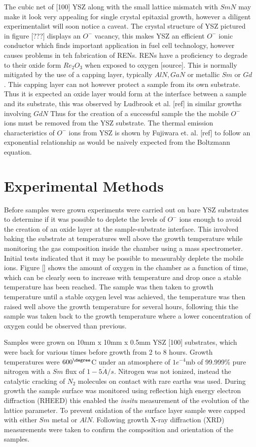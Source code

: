 \documentclass[11pt]{article}
\begin{document}
The cubic net of [100] YSZ along with the small lattice mismatch with $SmN$ may make it look very appealing for single crystal epitaxial growth, however a diligent experimentalist will soon notice a caveat. The crystal structure of YSZ pictured in figure [???] displays an $O^-$ vacancy, this makes YSZ an efficient $O^-$ ionic conductor which finds important application in fuel cell technology, however causes problems in teh fabrication of RENs. RENs have a proficiency to degrade to their oxide form $Re_2O_3$ when exposed to oxygen [source]. This is normally mitigated by the use of a capping layer, typically $AlN, GaN$ or metallic $Sm$ or $Gd$. This capping layer can not however protect a sample from its own substrate. Thus it is expected an oxide layer would form at the interface between a sample and its substrate, this
was observed by Ludbrook et al. [ref] in similar growths involving $GdN$ Thus for the creation of a successful sample the the mobile $O^-$ ions must be removed from the YSZ substrate. The thermal emission characteristics of $O^-$ ions from YSZ is shown by Fujiwara et. al. [ref] to follow an exponential relationship as would be naively expected from the Boltzmann equation. 

\section{Experimental Methods}

Before samples were grown experiments were carried out on bare YSZ substrates to determine if it was possible to deplete the levels of $O^-$ ions enough to avoid the creation of an oxide layer at the sample-substrate interface. This involved baking the substrate at temperatures well above the growth temperature while monitoring the gas composition inside the chamber using a mass spectrometer. Initial tests indicated that it may be possible to measurably deplete the mobile ions. Figure [] shows the amount of oxygen in the chamber as a function of time, which can be clearly seen to increase with temperature and drop once a stable temperature has been reached. The sample was then taken to growth temperature until a stable oxygen level was achieved, the temperature was then raised well above the growth temperature for several hours, following this the sample was taken back to the growth temperature where a lower concentration of oxygen could be observed than previous.

 
Samples were grown on 10mm x 10mm x 0.5mm YSZ [100] substrates, which were back for various times before growth from 2  to 8 hours. Growth temperatures were $600^\degree$C under an atmosphere of $1e^{-4}$mb of 99.999\% pure nitrogen with a $Sm$ flux of $1-5\mathring{A}/s$. Nitrogen was not ionized, instead the catalytic cracking of $N_2$ molecules on contact with rare earths was used. During growth the sample surface was monitored using reflection high energy electron diffraction (RHEED) this enabled the \emph{insitu} measurement of the evolution of the lattice parameter. To prevent oxidation of the surface layer sample were capped with either $Sm$ metal or $AlN$. Following growth X-ray diffraction (XRD) measurements were taken to confirm the composition and orientation of the samples.
\end{document}

